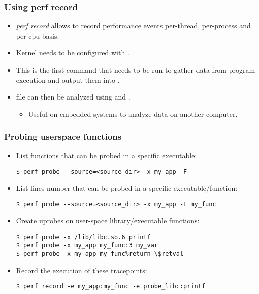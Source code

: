 \begin{frame}[fragile]
  \frametitle{Using perf record}
  \begin{itemize}
    \item {\em perf record} allows to record performance events per-thread,
          per-process and per-cpu basis.
    \item Kernel needs to be configured with .
    \item This is the first command that needs to be run to gather data from
          program execution and output them into .
    \item {} file can then be analyzed using 
          and .
    \begin{itemize}
      \item Useful on embedded systems to analyze data on another computer.
    \end{itemize}
  \end{itemize}
\end{frame}

\begin{frame}[fragile]
  \frametitle{Probing userspace functions}
  \begin{itemize}
    \item List functions that can be probed in a specific
          executable:
  \begin{block}{}
    \begin{verbatim}
$ perf probe --source=<source_dir> -x my_app -F
    \end{verbatim}
  \end{block}
    \item List lines number that can be probed in a specific
          executable/function:
  \begin{block}{}
    \begin{verbatim}
$ perf probe --source=<source_dir> -x my_app -L my_func
    \end{verbatim}
  \end{block}
    \item Create uprobes on user-space library/executable functions:
  \begin{block}{}
    \begin{verbatim}
$ perf probe -x /lib/libc.so.6 printf
$ perf probe -x my_app my_func:3 my_var
$ perf probe -x my_app my_func%return \$retval
    \end{verbatim}
  \end{block}
  \item Record the execution of these tracepoints:
  \begin{block}{}
    \begin{verbatim}
$ perf record -e my_app:my_func -e probe_libc:printf
    \end{verbatim}
  \end{block}
  \end{itemize}
\end{frame}

